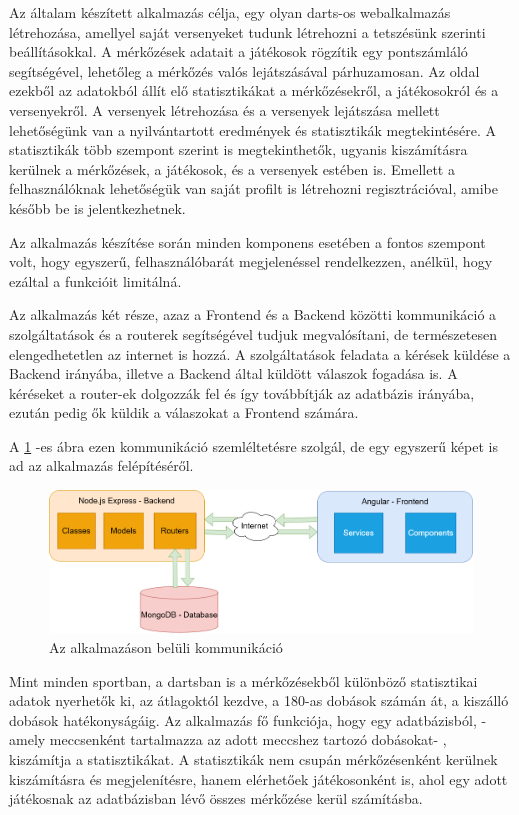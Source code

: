 
Az általam készített alkalmazás célja, egy olyan darts-os webalkalmazás létrehozása, amellyel saját versenyeket tudunk létrehozni a tetszésünk szerinti beállításokkal. A mérkőzések adatait a játékosok rögzítik egy pontszámláló segítségével, lehetőleg a mérkőzés valós lejátszásával párhuzamosan. Az oldal ezekből az adatokból állít elő statisztikákat a mérkőzésekről, a játékosokról és a versenyekről. A versenyek létrehozása és a versenyek lejátszása mellett lehetőségünk van a nyilvántartott eredmények és statisztikák megtekintésére. A statisztikák több szempont szerint is megtekinthetők, ugyanis kiszámításra kerülnek a mérkőzések, a játékosok, és a versenyek estében is. Emellett a felhasználóknak lehetőségük van saját profilt is létrehozni regisztrációval, amibe később be is jelentkezhetnek.

Az alkalmazás készítése során minden komponens esetében a fontos szempont volt, hogy egyszerű, felhasználóbarát megjelenéssel rendelkezzen, anélkül, hogy ezáltal a funkcióit limitálná.

Az alkalmazás két része, azaz a Frontend és a Backend közötti kommunikáció a szolgáltatások és a routerek segítségével tudjuk megvalósítani, de természetesen elengedhetetlen az internet is hozzá. A szolgáltatások feladata a kérések küldése a Backend irányába, illetve a Backend által küldött válaszok fogadása is. A kéréseket a router-ek dolgozzák fel és így továbbítják az adatbázis irányába, ezután pedig ők küldik a válaszokat a Frontend számára.

A \ref{fig:network} -es ábra ezen kommunikáció szemléltetésre szolgál, de egy egyszerű képet is ad az alkalmazás felépítéséről.

\begin{figure}[h]
\centering
\includegraphics[scale=0.4]{images/DoubleOut_Network.drawio.png}
\caption{Az alkalmazáson belüli kommunikáció}
\label{fig:network}
\end{figure}

Mint minden sportban, a dartsban is a mérkőzésekből különböző statisztikai adatok nyerhetők ki, az átlagoktól kezdve, a 180-as dobások számán át, a kiszálló dobások hatékonyságáig. Az alkalmazás fő funkciója, hogy egy adatbázisból, - amely meccsenként tartalmazza az adott meccshez tartozó dobásokat- , kiszámítja a statisztikákat. A statisztikák nem csupán mérkőzésenként kerülnek kiszámításra és megjelenítésre, hanem elérhetőek játékosonként is, ahol egy adott játékosnak az adatbázisban lévő összes mérkőzése kerül számításba.

